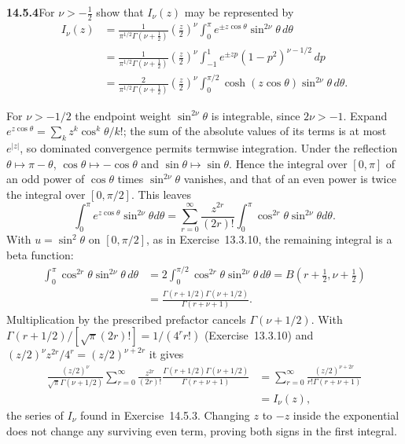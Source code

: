 \par\bigskip
\noindent\textbf{14.5.4}\quad For $\nu>-\frac{1}{2}$ show that
$I_{\nu}(z)$ may be represented by
\begin{align*}
I_{\nu}(z)&=\frac{1}{\pi^{1/2}\Gamma(\nu+\frac{1}{2})}
\left(\frac{z}{2}\right)^{\nu}
\int_{0}^{\pi}e^{\pm z\cos\theta}\sin^{2\nu}\theta\,d\theta\\[2pt]
&=\frac{1}{\pi^{1/2}\Gamma(\nu+\frac{1}{2})}
\left(\frac{z}{2}\right)^{\nu}
\int_{-1}^{1}e^{\pm zp}(1-p^{2})^{\nu-1/2}\,dp\\[2pt]
&=\frac{2}{\pi^{1/2}\Gamma(\nu+\frac{1}{2})}
\left(\frac{z}{2}\right)^{\nu}
\int_{0}^{\pi/2}\cosh(z\cos\theta)\sin^{2\nu}\theta\,d\theta.
\end{align*}
\par{}
\solution
For $\nu>-1/2$ the endpoint weight $\sin^{2\nu}\theta$ is
integrable, since $2\nu>-1$. Expand
$e^{z\cos\theta}=\sum_kz^k\cos^k\theta/k!$; the sum of the absolute
values of its terms is at most $e^{|z|}$, so dominated convergence
permits termwise integration. Under the reflection
$\theta\mapsto\pi-\theta$, $\cos\theta\mapsto-\cos\theta$ and
$\sin\theta\mapsto\sin\theta$. Hence the integral over $[0,\pi]$ of
an odd power of $\cos\theta$ times $\sin^{2\nu}\theta$ vanishes,
and that of an even power is twice the integral over $[0,\pi/2]$.
This leaves
\[
\int_0^\pi e^{z\cos\theta}\sin^{2\nu}\theta d\theta
=\sum_{r=0}^\infty\frac{z^{2r}}{(2r)!}
\int_0^\pi\cos^{2r}\theta\sin^{2\nu}\theta d\theta.
\]
With $u=\sin^2\theta$ on $[0,\pi/2]$, as in Exercise~13.3.10, the
remaining integral is a beta function:
\begin{align*}
\int_0^\pi\cos^{2r}\theta\sin^{2\nu}\theta\,d\theta
&=2\int_0^{\pi/2}\cos^{2r}\theta\sin^{2\nu}\theta\,d\theta
=B\left(r+\tfrac12,\nu+\tfrac12\right)\\
&=\frac{\Gamma(r+1/2)\Gamma(\nu+1/2)}{\Gamma(r+\nu+1)}.
\end{align*}
Multiplication by the prescribed prefactor cancels
$\Gamma(\nu+1/2)$. With $\Gamma(r+1/2)/[\sqrt\pi(2r)!]=1/(4^rr!)$
(Exercise~13.3.10) and $(z/2)^\nu z^{2r}/4^r=(z/2)^{\nu+2r}$ it
gives
\begin{align*}
\frac{(z/2)^\nu}{\sqrt\pi\Gamma(\nu+1/2)}
\sum_{r=0}^\infty\frac{z^{2r}}{(2r)!}
\frac{\Gamma(r+1/2)\Gamma(\nu+1/2)}{\Gamma(r+\nu+1)}
&=\sum_{r=0}^\infty
\frac{(z/2)^{\nu+2r}}{r!\Gamma(r+\nu+1)}\\
&=I_\nu(z),
\end{align*}
the series of $I_\nu$ found in Exercise~14.5.3.
Changing $z$ to $-z$ inside the exponential does not change any
surviving even term, proving both signs in the first integral.

